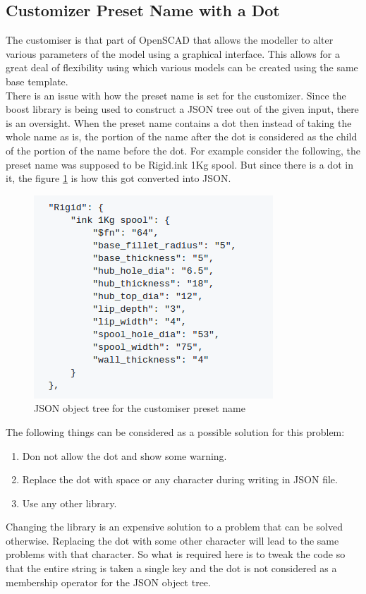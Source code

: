 \subsection{Customizer Preset Name with a Dot}
The customiser is that part of OpenSCAD that allows the modeller to alter various parameters of the model using a graphical interface. This allows for a great deal of flexibility using which various models can be created using the same base template.\\
There is an issue with how the preset name is set for the customizer. Since the boost library is being used to construct a JSON tree out of the given input, there is an oversight. When the preset name contains a dot then instead of taking the whole name as is, the portion of the name after the dot is considered as the child of the portion of the name before the dot. For example consider the following, the preset name was supposed to be Rigid.ink 1Kg spool. But since there is a dot in it, the figure \ref{fig:cp} is how this got converted into JSON.
\begin{figure}
	\centering
	\includegraphics{images/customiser_preset.png}
	\caption{JSON object tree for the customiser preset name}
	\label{fig:cp}
\end{figure}
The following things can be considered as a possible solution for this problem:
\begin{enumerate}
	\item Don not allow the dot and show some warning.
	\item Replace the dot with space or any character during writing in JSON file.
	\item Use any other library.
\end{enumerate}
Changing the library is an expensive solution to a problem that can be solved otherwise. Replacing the dot with some other character will lead to the same problems with that character. So what is required here is to tweak the code so that the entire string is taken a single key and the dot is not considered as a membership operator for the JSON object tree.
